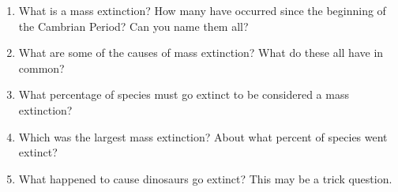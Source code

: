 \documentclass[letterpaper]{tufte-handout}
\begin{document}
\begin{enumerate}
	\item What is a mass extinction? How many have occurred since the beginning of the Cambrian Period? Can you name them all?
	
	\item What are some of the causes of mass extinction? What do these all have in common?
	
	\item What percentage of species must go extinct to be considered a mass extinction?
	
	\item Which was the largest mass extinction? About what percent of species went extinct?
	
	\item What happened to cause dinosaurs go extinct? This may be a trick question. 
	
\end{enumerate}
\end{document}

